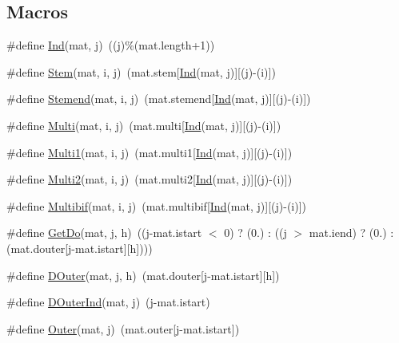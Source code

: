 \subsection*{Macros}
\begin{DoxyCompactItemize}
\item 
\#define \hyperlink{matrix_8hh_a86bb2cd84b8b46bd7709f3e2706128a7}{Ind}(mat, j)~((j)\%(mat.\+length+1))
\item 
\#define \hyperlink{matrix_8hh_a884bd30af2c24cbc6d050f96032b8908}{Stem}(mat, i, j)~(mat.\+stem\mbox{[}\hyperlink{matrix_8hh_a86bb2cd84b8b46bd7709f3e2706128a7}{Ind}(mat, j)\mbox{]}\mbox{[}(j)-\/(i)\mbox{]})
\item 
\#define \hyperlink{matrix_8hh_a05f323860c8ddad3c2f2cbe42ad26a24}{Stemend}(mat, i, j)~(mat.\+stemend\mbox{[}\hyperlink{matrix_8hh_a86bb2cd84b8b46bd7709f3e2706128a7}{Ind}(mat, j)\mbox{]}\mbox{[}(j)-\/(i)\mbox{]})
\item 
\#define \hyperlink{matrix_8hh_a2597f0c588e5b1afbb1d9757f3211132}{Multi}(mat, i, j)~(mat.\+multi\mbox{[}\hyperlink{matrix_8hh_a86bb2cd84b8b46bd7709f3e2706128a7}{Ind}(mat, j)\mbox{]}\mbox{[}(j)-\/(i)\mbox{]})
\item 
\#define \hyperlink{matrix_8hh_a8d73a18ba89901d60dbe77de01cc39c6}{Multi1}(mat, i, j)~(mat.\+multi1\mbox{[}\hyperlink{matrix_8hh_a86bb2cd84b8b46bd7709f3e2706128a7}{Ind}(mat, j)\mbox{]}\mbox{[}(j)-\/(i)\mbox{]})
\item 
\#define \hyperlink{matrix_8hh_a65dbd4eff057e962930243bf7ae5e120}{Multi2}(mat, i, j)~(mat.\+multi2\mbox{[}\hyperlink{matrix_8hh_a86bb2cd84b8b46bd7709f3e2706128a7}{Ind}(mat, j)\mbox{]}\mbox{[}(j)-\/(i)\mbox{]})
\item 
\#define \hyperlink{matrix_8hh_a452a5901adf33b09f675c2e3f31e3ba4}{Multibif}(mat, i, j)~(mat.\+multibif\mbox{[}\hyperlink{matrix_8hh_a86bb2cd84b8b46bd7709f3e2706128a7}{Ind}(mat, j)\mbox{]}\mbox{[}(j)-\/(i)\mbox{]})
\item 
\#define \hyperlink{matrix_8hh_a8421428b8784209efa9f6ff99468e7b3}{Get\+Do}(mat, j, h)~((j-\/mat.\+istart $<$ 0) ? (0.) \+: ((j $>$ mat.\+iend) ? (0.) \+: (mat.\+douter\mbox{[}j-\/mat.\+istart\mbox{]}\mbox{[}h\mbox{]})))
\item 
\#define \hyperlink{matrix_8hh_ac3f0a682371b9df49cf9b58304cad8ef}{D\+Outer}(mat, j, h)~(mat.\+douter\mbox{[}j-\/mat.\+istart\mbox{]}\mbox{[}h\mbox{]})
\item 
\#define \hyperlink{matrix_8hh_a7357ee3f9318d574b70b458b30aff546}{D\+Outer\+Ind}(mat, j)~(j-\/mat.\+istart)
\item 
\#define \hyperlink{matrix_8hh_a85e39e12ef8133feb2fcb998f82fae31}{Outer}(mat, j)~(mat.\+outer\mbox{[}j-\/mat.\+istart\mbox{]})
\end{DoxyCompactItemize}
